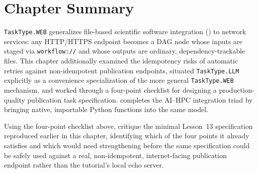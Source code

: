 \section{Chapter Summary}

\texttt{TaskType.WEB} generalizes file-based scientific software integration
() to network services: any HTTP/HTTPS endpoint
becomes a DAG node whose inputs are staged via \texttt{workflow://} and whose
outputs are ordinary, dependency-trackable files. This chapter additionally
examined the idempotency risks of automatic retries against non-idempotent
publication endpoints, situated \texttt{TaskType.LLM} explicitly as a
convenience specialization of the more general \texttt{TaskType.WEB}
mechanism, and worked through a four-point checklist for designing a
production-quality publication task specification. 
completes the AI--HPC integration triad by bringing native, importable
Python functions into the same model.

\begin{exercise}
Using the four-point checklist above, critique the minimal Lesson~13
specification reproduced earlier in this chapter, identifying which of the
four points it already satisfies and which would need strengthening before
the same specification could be safely used against a real, non-idempotent,
internet-facing publication endpoint rather than the tutorial's local echo
server.
\end{exercise}
